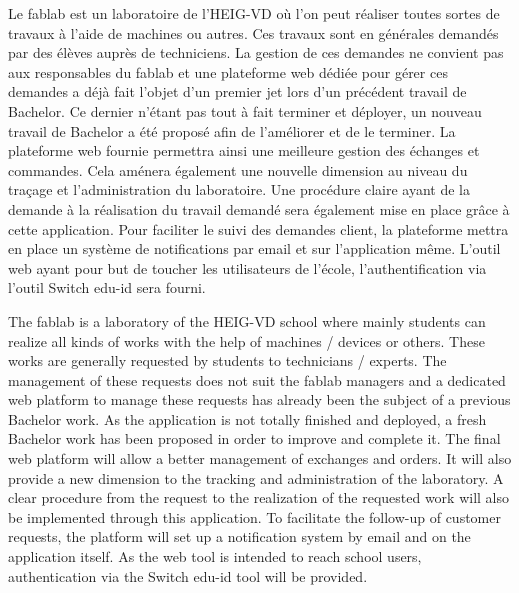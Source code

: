 Le fablab est un laboratoire de l'HEIG-VD où l'on peut réaliser toutes sortes de travaux à l'aide de machines ou autres. Ces travaux sont en générales demandés par des élèves auprès de techniciens. La gestion de ces demandes ne convient pas aux responsables du fablab et une plateforme web dédiée pour gérer ces demandes a déjà fait l'objet d'un premier jet lors d'un précédent travail de Bachelor. Ce dernier n'étant pas tout à fait terminer et déployer, un nouveau travail de Bachelor a été proposé afin de l'améliorer et de le terminer.
La plateforme web fournie permettra ainsi une meilleure gestion des échanges et commandes.
Cela aménera également une nouvelle dimension au niveau du traçage et l'administration du laboratoire.
Une procédure claire ayant de la demande à la réalisation du travail demandé sera également mise en place grâce à cette application.
Pour faciliter le suivi des demandes client, la plateforme mettra en place un système de notifications par email et sur l'application même.
L'outil web ayant pour but de toucher les utilisateurs de l'école, l'authentification via l'outil Switch edu-id sera fourni.

\asterism

The fablab is a laboratory of the HEIG-VD school where mainly students can realize all kinds of works with the help of machines / devices or others. These works are generally requested by students to technicians / experts. The management of these requests does not suit the fablab managers and a dedicated web platform to manage these requests has already been the subject of a previous Bachelor work. As the application is not totally finished and deployed, a fresh Bachelor work has been proposed in order to improve and complete it.
The final web platform will allow a better management of exchanges and orders.
It will also provide a new dimension to the tracking and administration of the laboratory.
A clear procedure from the request to the realization of the requested work will also be implemented through this application.
To facilitate the follow-up of customer requests, the platform will set up a notification system by email and on the application itself.
As the web tool is intended to reach school users, authentication via the Switch edu-id tool will be provided.